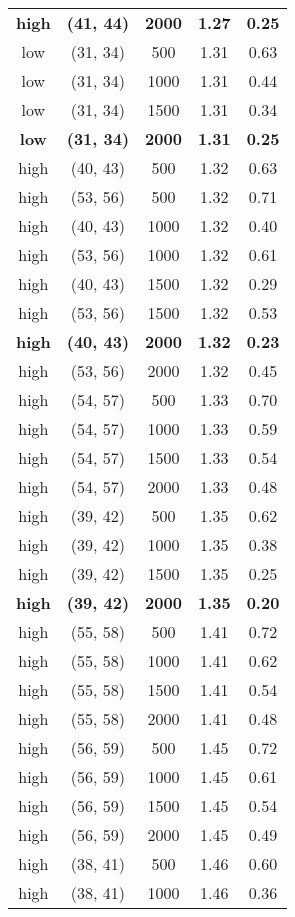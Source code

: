 \begin{tabular}{c c c c c}
\textbf{high} & \textbf{(41, 44)} & \textbf{ 2000} & \textbf{1.27} & \textbf{0.25} \\
low & (31, 34) &  500 & 1.31 & 0.63 \\
low & (31, 34) &  1000 & 1.31 & 0.44 \\
low & (31, 34) &  1500 & 1.31 & 0.34 \\
\textbf{low} & \textbf{(31, 34)} & \textbf{ 2000} & \textbf{1.31} & \textbf{0.25} \\
high & (40, 43) &  500 & 1.32 & 0.63 \\
high & (53, 56) &  500 & 1.32 & 0.71 \\
high & (40, 43) &  1000 & 1.32 & 0.40 \\
high & (53, 56) &  1000 & 1.32 & 0.61 \\
high & (40, 43) &  1500 & 1.32 & 0.29 \\
high & (53, 56) &  1500 & 1.32 & 0.53 \\
\textbf{high} & \textbf{(40, 43)} & \textbf{ 2000} & \textbf{1.32} & \textbf{0.23} \\
high & (53, 56) &  2000 & 1.32 & 0.45 \\
high & (54, 57) &  500 & 1.33 & 0.70 \\
high & (54, 57) &  1000 & 1.33 & 0.59 \\
high & (54, 57) &  1500 & 1.33 & 0.54 \\
high & (54, 57) &  2000 & 1.33 & 0.48 \\
high & (39, 42) &  500 & 1.35 & 0.62 \\
high & (39, 42) &  1000 & 1.35 & 0.38 \\
high & (39, 42) &  1500 & 1.35 & 0.25 \\
\textbf{high} & \textbf{(39, 42)} & \textbf{ 2000} & \textbf{1.35} & \textbf{0.20} \\
high & (55, 58) &  500 & 1.41 & 0.72 \\
high & (55, 58) &  1000 & 1.41 & 0.62 \\
high & (55, 58) &  1500 & 1.41 & 0.54 \\
high & (55, 58) &  2000 & 1.41 & 0.48 \\
high & (56, 59) &  500 & 1.45 & 0.72 \\
high & (56, 59) &  1000 & 1.45 & 0.61 \\
high & (56, 59) &  1500 & 1.45 & 0.54 \\
high & (56, 59) &  2000 & 1.45 & 0.49 \\
high & (38, 41) &  500 & 1.46 & 0.60 \\
high & (38, 41) &  1000 & 1.46 & 0.36 \\

\end{tabular}
